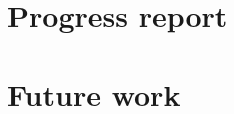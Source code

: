 \section{Progress report}\label{sec:progress_report}


\section{Future work}\label{sec:future_work}
